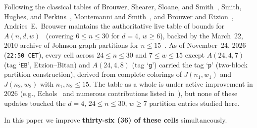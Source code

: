 \documentclass[11pt,letterpaper]{article}
\theoremstyle{plain}
\theoremstyle{definition}
\theoremstyle{remark}
\begin{document}
Following the classical tables of Brouwer, Shearer, Sloane, and Smith~\cite{BSSS1990}, Smith, Hughes, and Perkins~\cite{SmithHughesPerkins2006}, Montemanni and Smith~\cite{MontemanniSmith2009}, and Brouwer and Etzion~\cite{BrouwerEtzion2011}, Andries~E.\ Brouwer maintains the authoritative live table of bounds for $A(n, d, w)$~\cite{BrouwerAndw} (covering $6 \le n \le 30$ for $d = 4$, $w \ge 6$), backed by the March~22, 2010 archive of Johnson-graph partitions for $n \le 15$~\cite{BrouwerPartitions2010}. As of November~24, 2026 (\texttt{22:50 CET}), every cell across $24 \le n \le 30$ and $7 \le w \le 15$ except $A(24,4,7)$ (tag `\texttt{EB}', Etzion--Bitan) and $A(24,4,8)$ (tag `\texttt{g}') carried the tag `\texttt{p}' (two-block partition construction), derived from complete colorings of $J(n_1, w_1)$ and $J(n_2, w_2)$ with $n_1, n_2 \le 15$. The table as a whole is under active improvement in 2026 (e.g., Echols~\cite{Echols2026} and numerous contributions listed in~\cite{BrouwerAndw}), but none of these updates touched the $d = 4$, $24 \le n \le 30$, $w \ge 7$ partition entries studied here.

In this paper we improve \textbf{thirty-six (36) of these cells} simultaneously.
\end{document}

